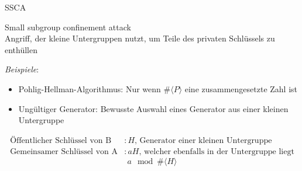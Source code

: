 \begin{frame}{SSCA}
    \begin{definitionblock}{Small subgroup confinement attack}
        \\Angriff, der kleine Untergruppen nutzt, um Teile des privaten Schlüssels zu enthüllen
        
     \end{definitionblock}
     \vspace{1em}
     \textit{Beispiele}:
        \begin{itemize}
            \item Pohlig-Hellman-Algorithmus: Nur wenn $\#\langle P \rangle$ eine zusammengesetzte Zahl ist
            \item Ungültiger Generator: Bewusste Auswahl eines Generator aus einer kleinen Untergruppe
                           
        \end{itemize}
            \begin{align*}
                 \text{Öffentlicher Schlüssel von B}&:H\text{, Generator einer kleinen Untergruppe}\\
                \text{Gemeinsamer Schlüssel von A}&:aH\text{, welcher ebenfalls in der Untergruppe liegt}
            \end{align*}
            \[a\mod{\#\langle H\rangle}\]

   
\end{frame}